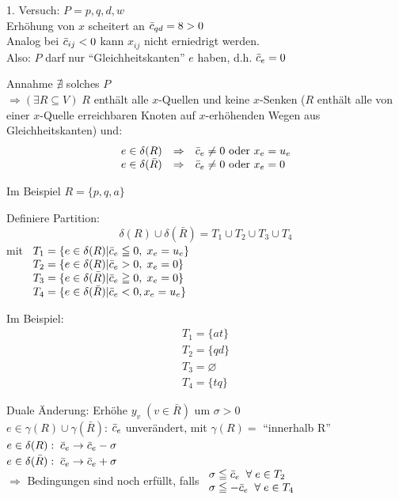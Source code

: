 1. Versuch: $P=p,q,d,w$\\
Erhöhung von $x$ scheitert an $\bar{c}_{q d} = 8 > 0$\\
Analog bei $\bar{c}_{i j} < 0$ kann $x_{i j}$ nicht erniedrigt werden.\\
Also: $P$ darf nur "`Gleichheitskanten"' $e$ haben, d.h. $\bar{c}_{e} = 0$

Annahme $\nexists$ solches $P$\\
$\Rightarrow (\exists R \subseteq V) \; R$ enthält alle $x$-Quellen und
keine $x$-Senken ($R$ enthält alle von einer $x$-Quelle erreichbaren
Knoten auf $x$-erhöhenden Wegen aus Gleichheitskanten) und:
\[\begin{array}{lcl}
e \in \delta(R) &\Rightarrow& \bar{c}_{e} \neq 0 \mbox{ oder } x_{e} = u_{e}\\
e \in \delta(\bar{R}) &\Rightarrow& \bar{c}_{e} \neq 0 \mbox{ oder } x_{e} =
0
\end{array}\]

Im Beispiel $R=\{p,q,a\}$

Definiere Partition:
\[\delta(R) \cup \delta(\bar{R}) = T_{1} \cup T_{2} \cup T_{3} \cup T_{4}\]
mit $\begin{array}[t]{lcl}
T_{1} = \{ e \in \delta(R) | \bar{c}_{e} \leqq 0, \; x_{e} = u_{e}\}\\
T_{2} = \{ e \in \delta(R) | \bar{c}_{e} > 0, \; x_{e} =0\}\\
T_{3} = \{e \in \delta(\bar{R}) | \bar{c}_{e} \geqq 0, \; x_{e} =0\}\\
T_{4} = \{e \in \delta(\bar{R}) | \bar{c}_{e} <0, x_{e} = u_{e}\} 
\end{array}$

Im Beispiel:
\[\begin{array}{rcl}
T_{1}=\{a t\}\\
T_{2}=\{q d\}\\
T_{3}=\varnothing\\
T_{4}=\{t q\}
\end{array}\]

Duale Änderung: Erhöhe $y_{v} \; (v\in \bar{R})$ um $\sigma > 0$\\
$e\in \gamma(R) \cup \gamma (\bar{R})$: $\bar{c}_{e}$ unverändert, mit
$\gamma(R) = $ "`innerhalb R"'\\
$e \in \delta(R): \; \bar{c}_{e} \rightarrow \bar{c}_{e} - \sigma$\\
$e \in \delta(\bar{R}): \; \bar{c}_{e} \rightarrow \bar{c}_{e} + \sigma$\\
$\Rightarrow$ Bedingungen sind noch erfüllt, falls $\begin{array}{l}
\sigma \leqq \bar{c}_{e} \; \; \forall \; e \in T_{2}\\
\sigma \leqq -\bar{c}_{e} \; \; \forall \; e \in T_{4}
\end{array}$

